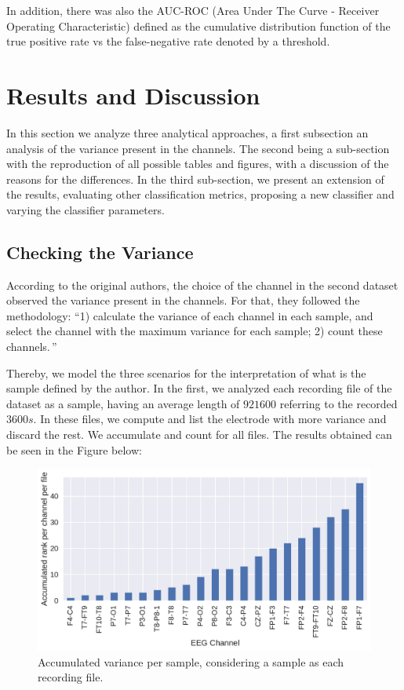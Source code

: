 In addition, there was also the AUC-ROC (Area Under The Curve - Receiver Operating Characteristic) defined as the cumulative distribution function of the true positive rate vs the false-negative rate denoted by a threshold.

\section{Results and Discussion}
\label{sec:resu}

In this section we analyze three analytical approaches, a first subsection an analysis of the variance present in the channels.
The second being a sub-section with the reproduction of all possible tables and figures, with a discussion of the reasons for the differences. In the third sub-section, we present an extension of the results, evaluating other classification metrics, proposing a new classifier and varying the classifier parameters.

\subsection{Checking the Variance} 

According to the original authors, the choice of the channel in the second dataset observed the variance present in the channels. For that, they followed the methodology: ``1) calculate the variance of each channel in each sample, and select the channel with the maximum variance for each sample; 2) count these channels.\,''

Thereby, we model the three scenarios for the interpretation of what is the sample defined by the author. In the first, we analyzed each recording file of the dataset as a sample, having an average length of $921600$ referring to the recorded $3600s$. In these files, we compute and list the electrode with more variance and discard the rest. We accumulate and count for all files. The results obtained can be seen in the Figure below:

\begin{figure}[!ht]
    \centering
    \includegraphics[width=\linewidth]{figure/variance_per_file.pdf}
    \caption{Accumulated variance per sample, considering a sample as each recording file.}
    \label{fig:variance_per_file}
\end{figure}

